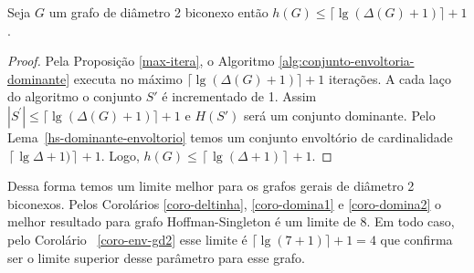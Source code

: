 
\begin{coro}
Seja $G$ um grafo de diâmetro 2 biconexo então $h(G) \le \Big\lceil \lg{(\Delta(G) + 1)} \Big\rceil + 1$.
\label{coro-env-gd2}
\end{coro}
\begin{proof}
Pela Proposição \ref{max-itera}, o Algoritmo \ref{alg:conjunto-envoltoria-dominante} executa no máximo $\Big\lceil \lg{(\Delta(G) + 1)} \Big\rceil + 1$ iterações. A cada laço do algoritmo o conjunto $S'$ é incrementado de 1. Assim $|S^\prime| \leq \Big\lceil \lg{(\Delta(G) + 1)} \Big\rceil + 1$ e $H(S')$ será um conjunto dominante.  Pelo Lema~\ref{hs-dominante-envoltorio} temos um conjunto envoltório de cardinalidade $\left \lceil \lg {\Delta + 1)} \right\rceil +1$. Logo, $h(G) \le \left\lceil \lg{(\Delta + 1)} \right\rceil + 1$.




\end{proof}

Dessa forma temos um limite melhor para os grafos gerais de diâmetro 2 biconexos. Pelos Corolários \ref{coro-deltinha}, \ref{coro-domina1} e \ref{coro-domina2} o melhor resultado para grafo Hoffman-Singleton é um limite de 8. Em todo caso, pelo Corolário ~\ref{coro-env-gd2} esse limite é $\Big\lceil \lg{(7 + 1)} \Big\rceil + 1=4$ que confirma ser o limite superior desse parâmetro para esse grafo.

